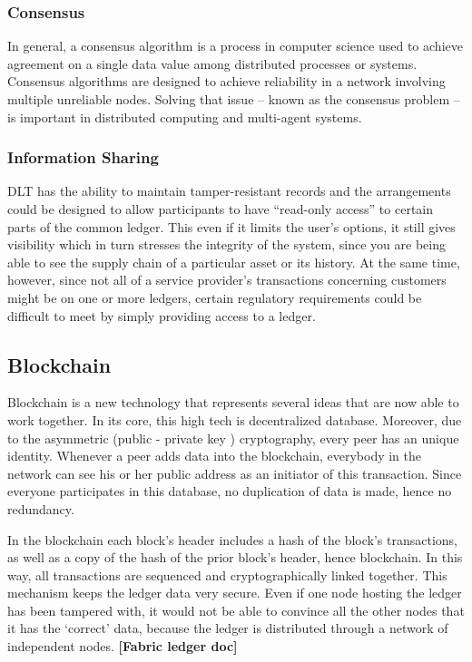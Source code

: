 \documentclass[a4paper,11pt]{report}
\begin{document}
\subsubsection{Consensus}  
\label{consensus}

In general, a consensus algorithm is a process in computer science used to achieve agreement on a single data value among distributed processes or systems. Consensus algorithms are designed to achieve reliability in a network involving multiple unreliable nodes. Solving that issue – known as the consensus problem – is important in distributed computing and multi-agent systems.\cite{mills2016distributed}

\subsubsection{Information Sharing}  
\label{infosharing}
DLT has the ability to maintain tamper-resistant records and the arrangements could be designed to allow participants to have “read-only access” to certain parts of the common ledger. This even if it limits the user’s options, it still gives visibility which in turn stresses the integrity of the system, since you are being able to see the supply chain of a particular asset or its history. At the same time, however, since not all of a service provider’s transactions concerning customers might be on one or more ledgers, certain regulatory requirements could be difficult to meet by simply providing access to a ledger.\cite{mills2016distributed}

\subsection{Blockchain}
\label{blockchain}

Blockchain is a new technology that represents several ideas that are now able to work together. In its core, this high tech is decentralized database. Moreover, due to the asymmetric (public - private key ) cryptography, every peer has an unique identity. Whenever a peer adds data into the blockchain, everybody in the network can see his or her public address as an initiator of this transaction. Since everyone participates in this database, no duplication of data is made, hence no redundancy. 

In the blockchain each block’s header includes a hash of the block’s transactions, as well as a copy of the hash of the prior block’s header, hence blockchain. In this way, all transactions are sequenced and cryptographically linked together. This mechanism keeps the ledger data very secure. Even if one node hosting the ledger has been tampered with, it would not be able to convince all the other nodes that it has the ‘correct’ data, because the ledger is distributed through a network of independent nodes. \textbf{[Fabric ledger doc] }
 
\end{document}

